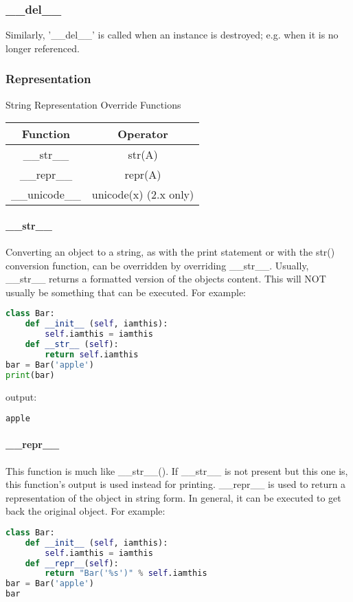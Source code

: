 \subsubsection{\_\_del\_\_}
Similarly, '\_\_del\_\_' is called when an instance is destroyed; e.g. when it
is no longer referenced.

\subsubsection{Representation}
String Representation Override Functions

\begin{tabular}{|c|c|}
\hline
Function&	Operator\\
\hline
\_\_str\_\_&	str(A)\\
\hline
\_\_repr\_\_&	repr(A)\\
\hline
\_\_unicode\_\_&	unicode(x) (2.x only)\\
\hline
\end{tabular}
\paragraph{\_\_str\_\_}
Converting an object to a string, as with the print statement or with the str()
conversion function, can be overridden by overriding \_\_str\_\_. Usually,
\_\_str\_\_ returns a formatted version of the objects content. This will NOT
usually be something that can be executed. For example:
\lstset{basicstyle=\scriptsize, numbers=left, captionpos=b, tabsize=4}
\begin{lstlisting}[caption=str example,language={Python},
xleftmargin=15pt, label=lst:strexample]
class Bar:
    def __init__ (self, iamthis):
        self.iamthis = iamthis
    def __str__ (self):
        return self.iamthis
bar = Bar('apple')
print(bar)
\end{lstlisting}

output:
\scriptsize
\begin{verbatim}
apple
\end{verbatim}
\normalsize

\paragraph{\_\_repr\_\_}
This function is much like \_\_str\_\_(). If \_\_str\_\_ is not present but this
one is, this function's output is used instead for printing. \_\_repr\_\_ is
used to return a representation of the object in string form. In general, it can
be executed to get back the original object. For example:
\lstset{basicstyle=\scriptsize, numbers=left, captionpos=b, tabsize=4}
\begin{lstlisting}[caption=repr example,language={Python},
xleftmargin=15pt, label=lst:reprexample]
class Bar:
    def __init__ (self, iamthis):
        self.iamthis = iamthis
    def __repr__(self):
        return "Bar('%s')" % self.iamthis
bar = Bar('apple')
bar
\end{lstlisting}

